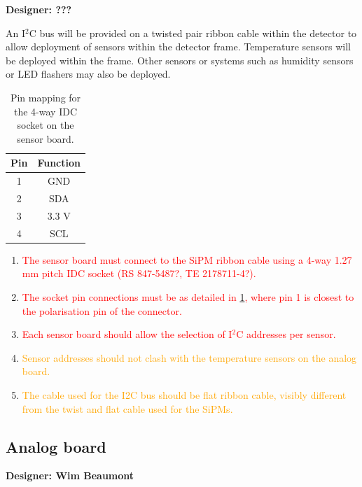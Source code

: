 \documentclass[a4paper]{article}
\newcommand{\must}[1]{\textcolor{red}{#1}}
\newcommand{\should}[1]{\textcolor{orange}{#1}}
\def\I2C{I$^2$C}
\begin{document}
{\bf Designer: ???}

An \I2C bus will be provided on a twisted pair ribbon cable within the detector to allow deployment of sensors within the detector frame.
Temperature sensors will be deployed within the frame.
Other sensors or systems such as humidity sensors or LED flashers may also be deployed.

\begin{table}[h]
    \begin{center}
        \caption{Pin mapping for the 4-way IDC socket on the sensor board.}
        \label{tab:IDC4waySensor}
        \begin{tabular}{cc}
            \hline
            \hline
            Pin & Function \\
            \hline
            1 & GND \\
            2 & SDA \\
            3 & 3.3 V \\
            4 & SCL \\
            \hline
            \hline
        \end{tabular}
    \end{center}
\end{table}

\begin{enumerate}
    \item \must{The sensor board must connect to the SiPM ribbon cable using a 4-way 1.27 mm pitch IDC socket (RS 847-5487?, TE 2178711-4?).}
    \item \must{The socket pin connections must be as detailed in \cref{tab:IDC4waySensor}, where pin 1 is closest to the polarisation pin of the connector.}
    \item \must{Each sensor board should allow the selection of \I2C addresses per sensor.}
    \item \should{Sensor addresses should not clash with the temperature sensors on the analog board.}
    \item \should{The cable used for the I2C bus should be flat ribbon cable, visibly different from the twist and flat cable used for the SiPMs.}
\end{enumerate}

\clearpage
\newpage
\subsection{Analog board}

{\bf Designer: Wim Beaumont}
\end{document}
